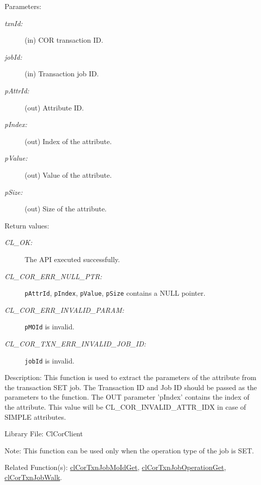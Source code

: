 \begin{flushleft}
\begin{Desc}
\begin{verbatim}
\end{verbatim}
\normalsize
\end{Desc}
\begin{Desc}
\item[Parameters:]
\begin{description}
\item[{\em txn\-Id:}](in) COR transaction ID.
\item[{\em job\-Id:}](in) Transaction job ID.
\item[{\em *p\-Attr\-Id:}](out) Attribute ID.
\item[{\em *p\-Index:}](out) Index of the attribute.
\item[{\em *p\-Value:}](out) Value of the attribute.
\item[{\em *p\-Size:}](out) Size of the attribute.
\end{description}
\end{Desc}
\begin{Desc}
\item[Return values:]
\begin{description}
\item[{\em CL\_\-OK:}]The API executed successfully. 
\item[{\em CL\_\-COR\_\-ERR\_\-NULL\_\-PTR:}] {\tt{pAttrId}}, {\tt{pIndex}}, {\tt{pValue}}, {\tt{pSize}} contains a NULL pointer.
\item[{\em CL\_\-COR\_\-ERR\_\-INVALID\_\-PARAM:}] {\tt{pMOId}} is invalid.
\item[{\em CL\_\-COR\_\-TXN\_\-ERR\_\-INVALID\_\-JOB\_\-ID:}] {\tt{jobId}} is invalid.
\end{description}
\end{Desc}
\begin{Desc}
\item[Description:] This function is used to extract the parameters of the attribute from the transaction SET job. The Transaction ID and Job ID should 
be passed as the parameters to the function. The OUT parameter 'pIndex' contains the index of the attribute. This value will be CL\_\-COR\_\-INVALID\_\-ATTR\_\-IDX 
in case of SIMPLE attributes.
\end{Desc}
\begin{Desc}
\item[Library File:]Cl\-Cor\-Client\end{Desc}
\begin{Desc}
\item[Note:]
This function can be used only when the operation type of the job is SET.
\end{Desc}
\begin{Desc}
\item[Related Function(s):]\hyperlink{pagecor202}{clCorTxnJobMoIdGet}, \hyperlink{pagecor204}{clCorTxnJobOperationGet}, 
\hyperlink{pagecor205}{clCorTxnJobWalk}.
\end{Desc} 	
\newpage







\end{flushleft}
